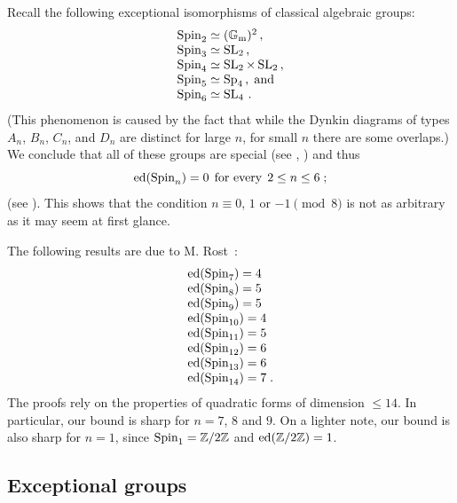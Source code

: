 \begin{remark} \label{rem.spin2-6} 
Recall the following exceptional isomorphisms of classical algebraic groups:
\[ \begin{array}{l} 
\operatorname{Spin}_2 \simeq ({\Bbb G}_{\operatorname{m}})^2 
\, , \\
\operatorname{Spin}_3 \simeq \operatorname{SL}_2 \, , \\
\operatorname{Spin}_4 \simeq \operatorname{SL}_2 \times \operatorname{SL}_2 \, , \\
\operatorname{Spin}_5 \simeq {\rm Sp}_4\, , \; \text{and} \\
\operatorname{Spin}_6 \simeq \operatorname{SL}_4 \, .
\end{array} \]
(This phenomenon is caused by
the fact that while the Dynkin diagrams of 
types $A_n$, $B_n$, $C_n$, and $D_n$ 
are distinct for large $n$, for small $n$ there are some overlaps.) 
We conclude that all of these groups are special (see
\cite[Section 5]{grothendieck}, \cite[Section 2.6]{pv}) and thus
\[ \operatorname{ed}(\operatorname{Spin}_n) = 0 \; \, 
\text{for every} \; \, 2 \leq n \leq 6  \; ; \]
(see \cite[Section 5.2]{r2}). This shows 
that the condition $n \equiv 0$, $1$ or $-1 \pmod 8$ is not 
as arbitrary as it may seem at first glance.
\end{remark}

\begin{remark} \label{rem.rost}
The following results are due to M. Rost~\cite{rostspin}:
\[ \begin{array}{l}
\operatorname{ed}( \operatorname{Spin}_7) = 4 \\
\operatorname{ed}( \operatorname{Spin}_8) = 5 \\
\operatorname{ed}( \operatorname{Spin}_9) = 5 \\
\operatorname{ed}( \operatorname{Spin}_{10}) = 4 \\
\operatorname{ed}( \operatorname{Spin}_{11}) = 5 \\
\operatorname{ed}( \operatorname{Spin}_{12}) = 6 \\
\operatorname{ed}( \operatorname{Spin}_{13}) = 6 \\
\operatorname{ed}( \operatorname{Spin}_{14}) = 7 \; . \end{array} \]
The proofs rely on the properties of quadratic forms 
of dimension $\leq 14$. In particular,
our bound is sharp for $n = 7$, $8$ and $9$.  On a lighter 
note, our bound is also sharp for $n = 1$, since $\operatorname{Spin}_1 = {\Bbb Z}/2{\Bbb Z}$
and $\operatorname{ed}({\Bbb Z}/2{\Bbb Z}) = 1$. 
\end{remark}

\subsection*{Exceptional groups}

